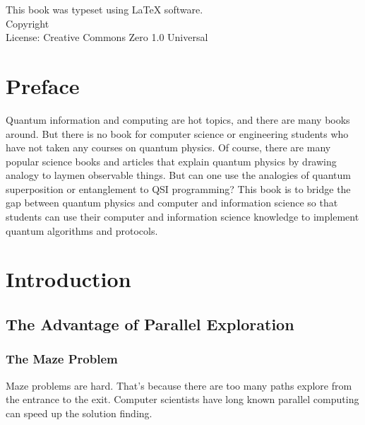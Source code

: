 \documentclass{book}
\makeatletter
\newcommand{\booklicense}{Creative Commons Zero 1.0 Universal}
\newcommand{\bookauthor}{\@author}
\makeatother
\begin{document}
\thispagestyle{empty}

\begin{flushleft}
\vspace*{\fill}
This book was typeset using \LaTeX{} software.\\
\vspace{\fill}
Copyright \textcopyright{} \the\year{}  \bookauthor\\
License: \booklicense
\end{flushleft}

\addtocounter{page}{2}

\chapter*{Preface}
Quantum information and computing are hot topics, and there are many books around. But there is no book for computer science or engineering students who have not taken any courses on quantum physics. Of course, there are many popular science books and articles that explain quantum physics by drawing analogy to laymen observable things. But can one use the analogies of quantum superposition or entanglement to QSI programming? This book is to bridge the gap between quantum physics and computer and information science so that students can use their computer and information science knowledge to implement quantum algorithms and protocols.

\setcounter{tocdepth}{3}
\tableofcontents

\mainmatter

\chapter{Introduction}
\section{The Advantage of Parallel Exploration}
\subsection{The Maze Problem}
Maze problems are hard. That's because there are too many paths explore from the entrance to the exit. Computer scientists have long known parallel computing can speed up the solution finding.
\end{document}
